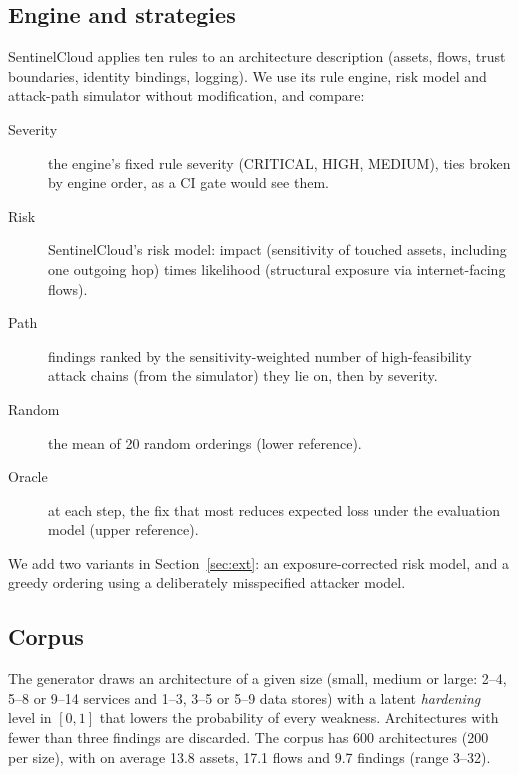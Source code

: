 \documentclass[11pt]{article}
\begin{document}
\subsection{Engine and strategies}
SentinelCloud \cite{sentinelcloud} applies ten rules to an architecture description (assets, flows, trust boundaries, identity bindings,
logging). We use its rule engine, risk model and attack-path simulator without modification, and compare:
\begin{description}
  \item[Severity] the engine's fixed rule severity (CRITICAL, HIGH, MEDIUM), ties broken by engine order, as a CI gate would see them.
  \item[Risk] SentinelCloud's risk model: impact (sensitivity of touched assets, including one outgoing hop) times likelihood
        (structural exposure via internet-facing flows).
  \item[Path] findings ranked by the sensitivity-weighted number of high-feasibility attack chains (from the simulator) they lie on,
        then by severity.
  \item[Random] the mean of 20 random orderings (lower reference).
  \item[Oracle] at each step, the fix that most reduces expected loss under the evaluation model (upper reference).
\end{description}
We add two variants in Section~\ref{sec:ext}: an exposure-corrected risk model, and a greedy ordering using a deliberately misspecified
attacker model.

\subsection{Corpus}
The generator draws an architecture of a given size (small, medium or large: 2--4, 5--8 or 9--14 services and 1--3, 3--5 or 5--9 data
stores) with a latent \emph{hardening} level in \([0,1]\) that lowers the probability of every weakness. Architectures with fewer than three
findings are discarded. The corpus has 600 architectures (200 per size), with on average 13.8 assets, 17.1 flows and 9.7 findings
(range 3--32).
\end{document}
